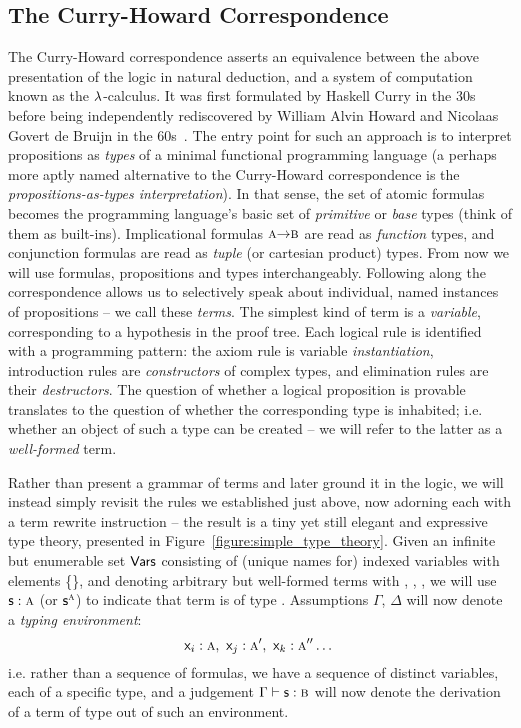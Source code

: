 \subsection{The Curry-Howard Correspondence}
The Curry-Howard correspondence asserts an equivalence between the above presentation of the logic in natural deduction, and a system of computation known as the $\mathnormal{\lambda}$-calculus.
It was first formulated by Haskell Curry in the 30s before being independently rediscovered by William Alvin Howard and Nicolaas Govert de Bruijn in the 60s~\cite{curry1934functionality,de1983automath,howard1980formulae}.
The entry point for such an approach is to interpret propositions as \textit{types} of a minimal functional programming language (a perhaps more aptly named alternative to the Curry-Howard correspondence is the \textit{propositions-as-types interpretation}).
In that sense, the set of atomic formulas \propcon{} becomes the programming language's basic set of \textit{primitive} or \textit{base} types (think of them as built-ins).
Implicational formulas $\smallprop{a} \ii \smallprop{b}$ are read as \textit{function} types, and conjunction formulas are read as \textit{tuple} (or cartesian product) types.
From now we will use formulas, propositions and types interchangeably.
Following along the correspondence allows us to selectively speak about individual, named instances of propositions -- we call these \textit{terms}.
The simplest kind of term is a \textit{variable}, corresponding to a hypothesis in the proof tree.
Each logical rule is identified with a programming pattern: the axiom rule is variable \textit{instantiation}, introduction rules are \textit{constructors} of complex types, and elimination rules are their \textit{destructors}.
The question of whether a logical proposition is provable translates to the question of whether the corresponding type is inhabited; i.e. whether an object of such a type can be created -- we will refer to the latter as a \textit{well-formed} term.

Rather than present a grammar of terms and later ground it in the logic, we will instead simply revisit the rules we established just above, now adorning each with a term rewrite instruction -- the result is a tiny yet still elegant and expressive type theory, presented in Figure~\ref{figure:simple_type_theory}.
Given an infinite but enumerable set $\mathsf{Vars}$ consisting of (unique names for) indexed variables with elements \{\term{\vari, \varj, \vark, \varl, \dots}\}, and denoting arbitrary but well-formed terms with , , , we will use $\mathsf{s}: \normalfont\textsc{a}$ (or $\mathsf{s}^{\normalfont\textsc{a}}$) to indicate that term  is of type .
Assumptions $\Gamma$, $\Delta$ will now denote a \textit{typing environment}:
\begin{equation}
\vari : \prop a ,~  \varj : \prop a',~ \vark : \prop a'' \dots
\end{equation}
i.e. rather than a sequence of formulas, we have a sequence of distinct variables, each of a specific type, and a judgement $\Gamma \vdash \term{s} : \prop{b}$ will now denote the derivation of a term  of type  out of such an environment.


